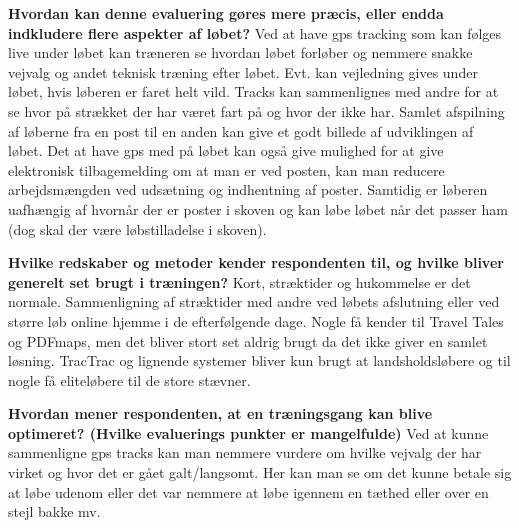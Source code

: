 \textbf{Hvordan kan denne evaluering gøres mere præcis, eller endda indkludere flere aspekter af løbet?} \newline
Ved at have gps tracking som kan følges live under løbet kan træneren se hvordan løbet forløber og nemmere snakke vejvalg og andet teknisk træning efter løbet. Evt. kan vejledning gives under løbet, hvis løberen er faret helt vild. Tracks kan sammenlignes med andre for at se hvor på strækket der har været fart på og hvor der ikke har. Samlet afspilning af løberne fra en post til en anden kan give et godt billede af udviklingen af løbet.
Det at have gps med på løbet kan også give mulighed for at give elektronisk tilbagemelding om at man er ved posten, kan man reducere arbejdsmængden ved udsætning og indhentning af poster. Samtidig er løberen uafhængig af hvornår der er poster i skoven og kan løbe løbet når det passer ham (dog skal der være løbstilladelse i skoven).

\textbf{Hvilke redskaber og metoder kender respondenten til, og hvilke bliver generelt set brugt i træningen?}\newline
Kort, stræktider og hukommelse er det normale. Sammenligning af stræktider med andre ved løbets afslutning eller ved større løb online hjemme i de efterfølgende dage.
Nogle få kender til Travel Tales og PDFmaps, men det bliver stort set aldrig brugt da det ikke giver en samlet løsning.
TracTrac og lignende systemer bliver kun brugt at landsholdsløbere og til nogle få eliteløbere til de store stævner.

\textbf{Hvordan mener respondenten, at en træningsgang kan blive optimeret? (Hvilke evaluerings punkter er mangelfulde)}\newline
Ved at kunne sammenligne gps tracks kan man nemmere vurdere om hvilke vejvalg der har virket og hvor det er gået galt/langsomt. Her kan man se om det kunne betale sig at løbe udenom eller det var nemmere at løbe igennem en tæthed eller over en stejl bakke mv.